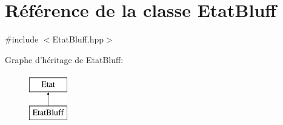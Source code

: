 \hypertarget{class_etat_bluff}{\section{Référence de la classe Etat\-Bluff}
\label{class_etat_bluff}
}


{\ttfamily \#include $<$Etat\-Bluff.\-hpp$>$}

Graphe d'héritage de Etat\-Bluff\-:\begin{figure}[H]
\begin{center}
\leavevmode
\includegraphics[height=2.000000cm]{class_etat_bluff}
\end{center}
\end{figure}
